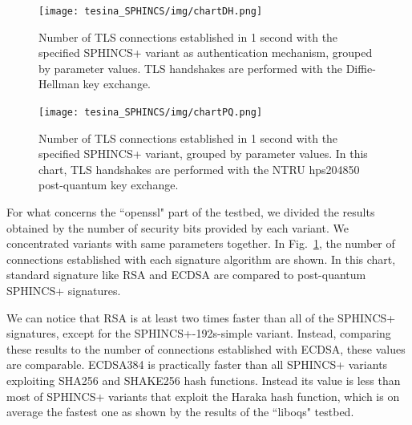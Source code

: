 \documentclass[a4paper,12pt]{article}
\def\myfig#1{Fig.~#1\xspace}
\begin{document}
\begin{figure}
\centerline{\texttt{[image: tesina\_SPHINCS/img/chartDH.png]}}
\caption{Number of TLS connections established in 1 second with the specified SPHINCS+ variant as authentication mechanism, grouped by parameter values. TLS handshakes are performed with the Diffie-Hellman key exchange.}
\label{fig:chartDH}
\end{figure}

\begin{figure}
\centerline{\texttt{[image: tesina\_SPHINCS/img/chartPQ.png]}}
\caption{Number of TLS connections established in 1 second with the specified SPHINCS+ variant, grouped by parameter values. In this chart, TLS handshakes are performed with the NTRU hps204850 post-quantum key exchange.}
\label{fig:chartPQ}
\end{figure}

For what concerns the ``openssl" part of the testbed, we divided the results obtained by the number of security bits provided by each variant. We concentrated variants with same parameters together. In \myfig{\ref{fig:chartDH}}, the number of connections established with each signature algorithm are shown. 
In this chart, standard signature like RSA and ECDSA are compared to post-quantum SPHINCS+ signatures. 

We can notice that RSA is at least two times faster than all of the SPHINCS+ signatures, except for the SPHINCS+-192s-simple variant. Instead, comparing these results to the number of connections established with ECDSA, these values are comparable. ECDSA384 is practically faster than all SPHINCS+ variants exploiting SHA256 and SHAKE256 hash functions. Instead its value is less than most of SPHINCS+ variants that exploit the Haraka hash function, which is on average the fastest one as shown by the results of the ``liboqs" testbed.
\end{document}
